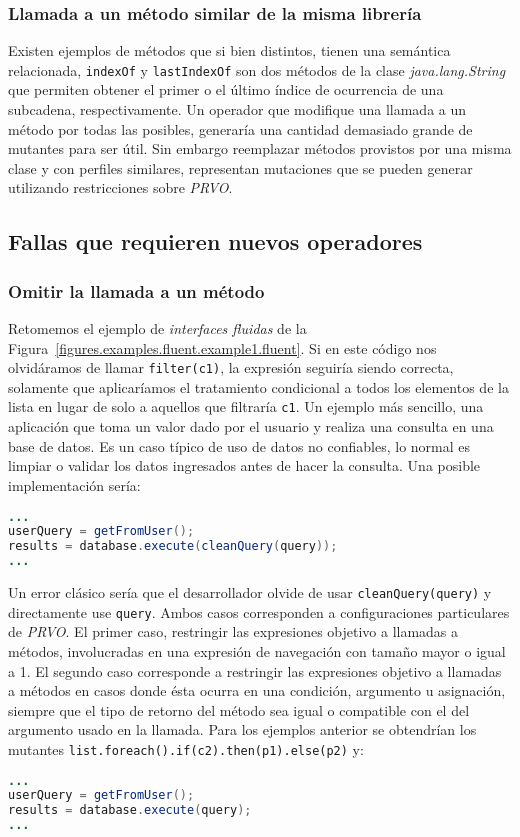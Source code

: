 \subsubsection{Llamada a un m\'etodo similar de la misma librer\'ia}

Existen ejemplos de m\'etodos que si bien distintos, tienen una sem\'antica relacionada, \texttt{indexOf} y \texttt{lastIndexOf} son dos m\'etodos de la clase \emph{java.lang.String} que permiten obtener el primer o el \'ultimo \'indice de ocurrencia de una subcadena, respectivamente. Un operador que modifique una llamada a un m\'etodo por todas las posibles, generar\'ia una cantidad demasiado grande de mutantes para ser \'util. Sin embargo reemplazar m\'etodos provistos por una misma clase y con perfiles similares, representan mutaciones que se pueden generar utilizando restricciones sobre \emph{PRVO}.

\subsection{Fallas que requieren nuevos operadores}

\subsubsection{Omitir la llamada a un m\'etodo}

Retomemos el ejemplo de \emph{interfaces fluidas} de la Figura~\ref{figures.examples.fluent.example1.fluent}. Si en este c\'odigo nos olvid\'aramos de llamar \texttt{filter(c1)}, la expresi\'on seguir\'ia siendo correcta, solamente que aplicar\'iamos el tratamiento condicional a todos los elementos de la lista en lugar de solo a aquellos que filtrar\'ia \texttt{c1}. Un ejemplo m\'as sencillo, una aplicaci\'on que toma un valor dado por el usuario y realiza una consulta en una base de datos. Es un caso t\'ipico de uso de datos no confiables, lo normal es limpiar o validar los datos ingresados antes de hacer la consulta. Una posible implementaci\'on ser\'ia:
\begin{lstlisting}[language=Java,basicstyle={}]
...
userQuery = getFromUser();
results = database.execute(cleanQuery(query));
...
\end{lstlisting}
Un error cl\'asico ser\'ia que el desarrollador olvide de usar \texttt{cleanQuery(query)} y directamente use \texttt{query}. Ambos casos corresponden a configuraciones particulares de \emph{PRVO}. El primer caso, restringir las expresiones objetivo a llamadas a m\'etodos, involucradas en una expresi\'on de navegaci\'on con tama\~no mayor o igual a 1. El segundo caso corresponde a restringir las expresiones objetivo a llamadas a m\'etodos en casos donde \'esta ocurra en una condici\'on, argumento u asignaci\'on, siempre que el tipo de retorno del m\'etodo sea igual o compatible con el del argumento usado en la llamada. Para los ejemplos anterior se obtendr\'ian los mutantes \lstinline{list.foreach().if(c2).then(p1).else(p2)} y:
\begin{lstlisting}[language=Java,basicstyle={}]
...
userQuery = getFromUser();
results = database.execute(query);
...
\end{lstlisting}

